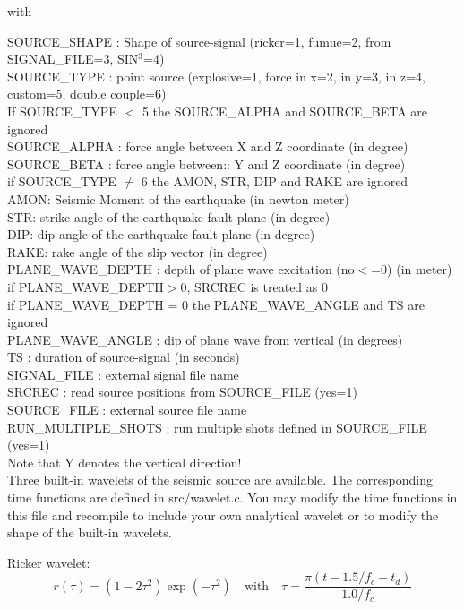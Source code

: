 \documentclass{hitec}
\begin{document}
with

SOURCE\_SHAPE : Shape of source-signal (ricker=1, fumue=2, from SIGNAL\_FILE=3, SIN$^3$=4) \\
SOURCE\_TYPE : point source (explosive=1, force in x=2, in y=3, in z=4, custom=5, double couple=6) \\
If SOURCE\_TYPE $<$ 5 the SOURCE\_ALPHA and SOURCE\_BETA are ignored \\
SOURCE\_ALPHA : force angle between X and Z coordinate (in degree)\\
SOURCE\_BETA : force angle between:: Y and Z coordinate (in degree)\\
if SOURCE\_TYPE $\ne$ 6 the AMON, STR, DIP and RAKE are ignored\\
AMON: Seismic Moment of the earthquake (in newton meter)\\
STR: strike angle of the earthquake fault plane (in degree)\\
DIP: dip angle of the earthquake fault plane (in degree)\\
RAKE: rake angle of the slip vector (in degree)\\
PLANE\_WAVE\_DEPTH : depth of plane wave excitation (no$<$=0) (in meter)\\
if PLANE\_WAVE\_DEPTH$>$0, SRCREC is treated as 0\\
if PLANE\_WAVE\_DEPTH = 0 the PLANE\_WAVE\_ANGLE and TS  are ignored\\
PLANE\_WAVE\_ANGLE : dip of plane wave from vertical (in degrees)\\
TS : duration of source-signal (in seconds)\\
SIGNAL\_FILE : external signal file name \\
SRCREC : read source positions from SOURCE\_FILE (yes=1)\\
SOURCE\_FILE : external source file name \\
RUN\_MULTIPLE\_SHOTS : run multiple shots defined in SOURCE\_FILE (yes=1)\\
Note that Y denotes the vertical direction!\\

Three built-in wavelets of the seismic source are available. The corresponding time functions are defined in src/wavelet.c. You may modify the time functions in this file and recompile to include your
own analytical wavelet or to modify the shape of the built-in wavelets.

Ricker wavelet:
\begin{equation}
r(\tau)=\left(1-2\tau^2\right)\exp(-\tau^2) \quad \mbox{with} \quad \tau=\frac{\pi(t-1.5/f_c-t_d)}{1.0/f_c}
\label{eq_ricker}
\end{equation}
\end{document}

